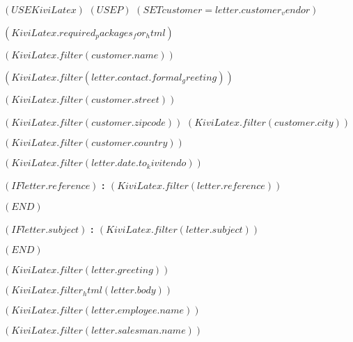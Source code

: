 $( USE KiviLatex )$
$( USE P )$
$( SET customer = letter.customer_vendor )$

$( KiviLatex.required_packages_for_html )$

\newcommand{\lxlangcode}{$(template_meta.language.template_code)$}
\newcommand{\lxmedia}{$(template_meta.media)$}
\newcommand{\lxcurrency}{}
\newcommand{\lxtitlebar}{}



\ourhead{}{}{}{}{}



\fontsize{10pt}{12pt}\selectfont

\vspace*{1cm}

\begin{minipage}{14cm}

  $( KiviLatex.filter(customer.name) )$

  $( KiviLatex.filter(letter.contact.formal_greeting) )$

  $( KiviLatex.filter(customer.street) )$

  $( KiviLatex.filter(customer.zipcode) )$ $( KiviLatex.filter(customer.city) )$

  $( KiviLatex.filter(customer.country) )$

\end{minipage}

\vspace{2.5cm}
\hfill $( KiviLatex.filter(letter.date.to_kivitendo) )$

$( IF letter.reference )$
\textbf{\ihrzeichen : $( KiviLatex.filter(letter.reference) )$}

\vspace{1cm}
$( END )$

$( IF letter.subject )$
\textbf{\betreff : $( KiviLatex.filter(letter.subject) )$}

\vspace{1cm}
$( END )$

$( KiviLatex.filter(letter.greeting) )$

\vspace{0.5cm}

$( KiviLatex.filter_html(letter.body) )$

\vspace{0.5cm}

\begin{minipage}{6cm}

\textbf{$( KiviLatex.filter(letter.employee.name) )$}

\end{minipage}
\begin{minipage}{6cm}

\textbf{$( KiviLatex.filter(letter.salesman.name) )$}

\end{minipage}



